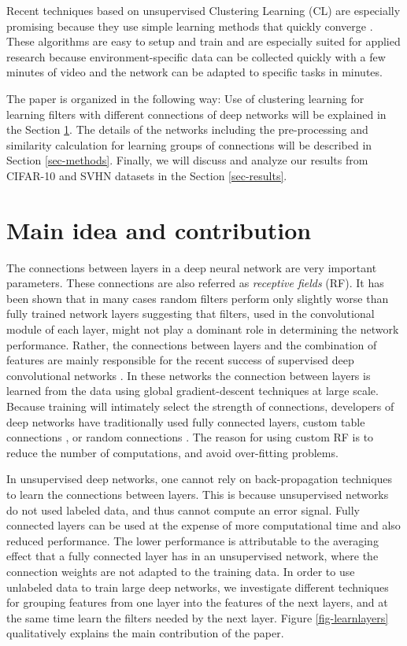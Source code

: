 \documentclass{article} %
\begin{document}
Recent techniques based on unsupervised Clustering Learning (CL) are especially promising because they use 
simple learning methods that quickly converge \cite{culurciello2013clustering,coates_analysis_2011}.
These algorithms are easy to setup and train and are especially suited for applied research because environment-specific data 
can be collected quickly with a few minutes of video and the network can be adapted to specific tasks in minutes.

The paper is organized in the following way: 
Use of clustering learning for learning filters with different connections of deep networks will be explained in the Section \ref{sec-main}. 
The details of the networks including the pre-processing and similarity calculation for learning groups of connections will be described in Section \ref{sec-methods}. 
Finally, we will discuss and analyze our results from CIFAR-10 and SVHN datasets in the Section \ref{sec-results}. 


\section{Main idea and contribution}
\label{sec-main}

The connections between layers in a deep neural network are very important parameters. These connections are also referred as \textit{receptive fields} (RF).
It has been shown that in many cases random filters perform only slightly worse than fully trained network layers \cite{saxe2011random} suggesting
that filters, used in the convolutional module of each layer, might not play a dominant role in determining the network performance.
Rather, the connections between layers and the combination of features are mainly responsible for the recent success of 
supervised deep convolutional networks \cite{krizhevsky_imagenet_2012}.
In these networks the connection between layers is
learned from the data using global gradient-descent techniques at large scale.
Because training will intimately select the strength of connections, 
developers of deep networks have traditionally used fully connected layers, custom table connections \cite{lecun_gradient-based_1998}, or 
random connections \cite{lecun_convolutional_2010}.
The reason for using custom RF is to reduce the number of computations, and avoid over-fitting problems.
 
In unsupervised deep networks, one cannot rely on back-propagation techniques to learn the connections between layers. 
This is because unsupervised networks do not used labeled data, and thus cannot compute an error signal. 
Fully connected layers can be used \cite{culurciello2013clustering,coates_analysis_2011} at the expense of more computational time and also reduced performance.
The lower performance is attributable to the averaging effect that a fully connected layer has in an unsupervised network, 
where the connection weights are not adapted to the training data.
In order to use unlabeled data to train large deep networks, we investigate different techniques for grouping features from one layer into the features of the next layers, 
and at the same time learn the filters needed by the next layer.
Figure \ref{fig-learnlayers} qualitatively explains the main contribution of the paper.
\end{document}
